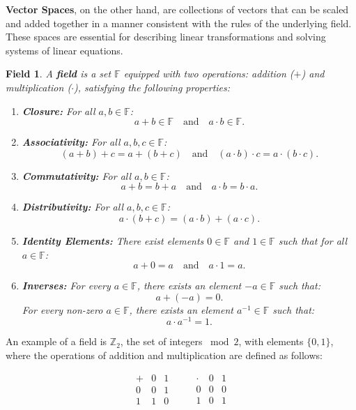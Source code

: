 \textbf{Vector Spaces}, on the other hand, are collections of vectors that can be scaled and added together in a manner consistent with the rules of the underlying field. These spaces are essential for describing linear transformations and solving systems of linear equations.

\newtheorem*{fld}{Field}
\begin{fld}
A \textbf{field} is a set $\mathbb{F}$ equipped with two operations: addition ($+$) and multiplication ($\cdot$), satisfying the following properties:

\begin{enumerate}
    \item \textbf{Closure:} For all $a, b \in \mathbb{F}$:
    \[
    a + b \in \mathbb{F} \quad \text{and} \quad a \cdot b \in \mathbb{F}.
    \]

    \item \textbf{Associativity:} For all $a, b, c \in \mathbb{F}$:
    \[
    (a + b) + c = a + (b + c) \quad \text{and} \quad (a \cdot b) \cdot c = a \cdot (b \cdot c).
    \]

    \item \textbf{Commutativity:} For all $a, b \in \mathbb{F}$:
    \[
    a + b = b + a \quad \text{and} \quad a \cdot b = b \cdot a.
    \]

    \item \textbf{Distributivity:} For all $a, b, c \in \mathbb{F}$:
    \[
    a \cdot (b + c) = (a \cdot b) + (a \cdot c).
    \]

    \item \textbf{Identity Elements:} There exist elements $0 \in \mathbb{F}$ and $1 \in \mathbb{F}$ such that for all $a \in \mathbb{F}$:
    \[
    a + 0 = a \quad \text{and} \quad a \cdot 1 = a.
    \]

    \item \textbf{Inverses:} For every $a \in \mathbb{F}$, there exists an element $-a \in \mathbb{F}$ such that:
    \[
    a + (-a) = 0.
    \]
    For every non-zero $a \in \mathbb{F}$, there exists an element $a^{-1} \in \mathbb{F}$ such that:
    \[
    a \cdot a^{-1} = 1.
    \]
\end{enumerate}
\end{fld}

An example of a field is $\mathbb{Z}_2$, the set of integers $\bmod 2$, with elements $\{0, 1\}$, where the operations of addition and multiplication are defined as follows:

\[
\begin{array}{c|cc}
+ & 0 & 1 \\
\hline
0 & 0 & 1 \\
1 & 1 & 0 \\
\end{array}
\quad \quad
\begin{array}{c|cc}
\cdot & 0 & 1 \\
\hline
0 & 0 & 0 \\
1 & 0 & 1 \\
\end{array}
\]


